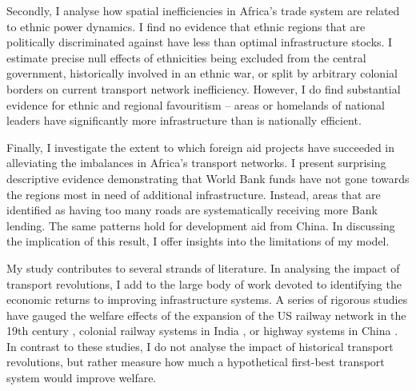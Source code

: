 \documentclass[11pt, oneside]{article}   	%
\begin{document}
Secondly, I analyse how spatial inefficiencies in Africa's trade system are related to ethnic power dynamics. I find no evidence that ethnic regions that are politically discriminated against have less than optimal infrastructure stocks. I estimate precise null effects of ethnicities being excluded from the central government, historically involved in an ethnic war, or split by arbitrary colonial borders \citep{michalopoulos_long-run_2016} on current transport network inefficiency. However, I do find substantial evidence for ethnic and regional favouritism -- areas or homelands of national leaders have significantly more infrastructure than is nationally efficient.

Finally, I investigate the extent to which foreign aid projects have succeeded in alleviating the imbalances in Africa's transport networks. I present surprising descriptive evidence demonstrating that World Bank funds have not gone towards the regions most in need of additional infrastructure. Instead, areas that are identified as having too many roads are systematically receiving more Bank lending. The same patterns hold for development aid from China. In discussing the implication of this result, I offer insights into the limitations of my model.

My study contributes to several strands of literature. In analysing the impact of transport revolutions, I add to the large body of work devoted to identifying the economic returns to improving infrastructure systems. A series of rigorous studies have gauged the welfare effects of the expansion of the US railway network in the 19th century \citep{donaldson_railroads_2016,swisher_reassessing_2017}, colonial railway systems in India \citep{Donaldson_RailroadsRajEstimating_2018,burgess_railroads_2012}, or highway systems in China \citep{faber_trade_2014,baum-snow_roads_2017}. In contrast to these studies, I do not analyse the impact of historical transport revolutions, but rather measure how much a hypothetical first-best transport system would improve welfare.
\end{document}
